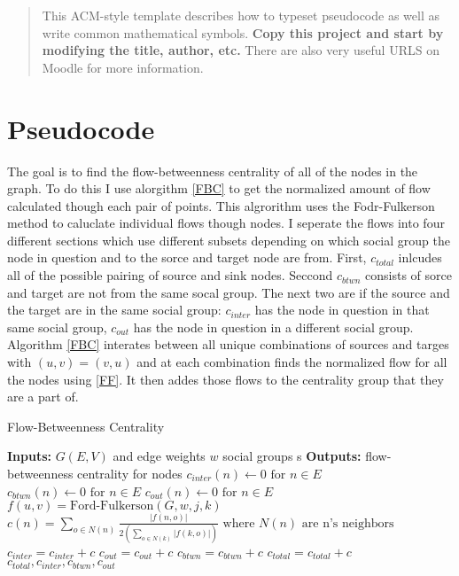 \documentclass{sig-alternate-05-2015}
\begin{document}
\maketitle

\begin{abstract}
This ACM-style template describes how to typeset pseudocode as well as write common mathematical symbols.  \textbf{Copy this project and start by modifying the title, author, etc.}  There are also very useful URLS on Moodle for more information.
\end{abstract}



\section{Pseudocode}
The goal is to find the flow-betweenness centrality of all of the nodes in the graph.  To do this I use alorgithm \ref{FBC} to get the normalized amount of flow calculated though each pair of points.  This algrorithm uses the Fodr-Fulkerson method to caluclate individual flows though nodes.  I seperate the flows into four different sections which use different subsets depending on which social group the node in question and to the sorce and target node are from.  First, $c_{total}$ inlcudes all of the possible pairing of source and sink nodes.  Seccond $c_{btwn}$ consists of sorce and target are not from the same socal group.  The next two are if the source and the target are in the same social group: $c_{inter}$ has the node in question in that same social group, $c_{out}$ has the node in question in a different social group. Algorithm \ref{FBC} interates between all unique combinations of sources and targes with $(u,v) = (v,u)$ and at each combination finds the normalized flow for all the nodes using \ref{FF}.  It then addes those flows to the centrality group that they are a part of.  

\begin{algorithm}
\caption{Flow-Betweenness Centrality}
\label{FBC}
\begin{algorithmic}
\STATE \textbf{Inputs:} $G(E,V)$ and edge weights $w$ social groups s
\STATE \textbf{Outputs:} flow-betweenness centrality for nodes
\STATE $c_{inter}(n) \leftarrow 0 \text{ for } n \in E$
\STATE $c_{btwn}(n) \leftarrow 0 \text{ for } n \in E$
\STATE $c_{out}(n) \leftarrow 0 \text{ for } n \in E$
\STATE $ f(u,v) = \text{Ford-Fulkerson} (G,w,j,k)$
\STATE $c(n) = \sum_{o \in N(n)}\frac{| f(n,o)|}{2 (\sum_{o \in N(k)}|f(k,o)|)} \text{ where } N(n) \text{ are n's neighbors} $
\STATE $c_{inter} = c_{inter} + c$
\STATE $c_{out} = c_{out} + c$
\ELSE 
\STATE $c_{btwn} = c_{btwn} + c$
\ENDIF
\STATE $c_{total} = c_{total} + c$
\ENDFOR
\ENDFOR
\ENDFOR
\RETURN $c_{total}, c_{inter}, c_{btwn}, c_{out}$
\end{algorithmic}
\end{algorithm}
\end{document}
